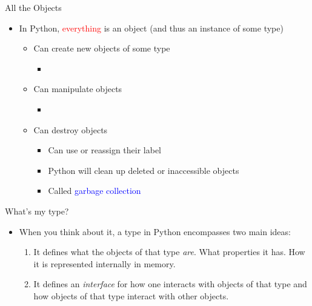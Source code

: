 \documentclass[pdf, aspectratio=169, 12pt]{beamer}
\begin{document}
\begin{frame}{All the Objects}
	\begin{itemize}
		\item In Python, \textcolor{Red}{everything} is an object (and thus an instance of some type)
			\begin{itemize}
				\item Can \alert{create} new objects of some type
					\begin{itemize}
						\item {}
					\end{itemize}
				\item Can \alert{manipulate} objects
					\begin{itemize}
						\item {}
					\end{itemize}
				\item Can \alert{destroy} objects
					\begin{itemize}
						\item Can use  or reassign their label
						\item Python will clean up deleted or inaccessible objects
						\item Called \textcolor{Blue}{garbage collection}
					\end{itemize}
			\end{itemize}
	\end{itemize}
\end{frame}

\begin{frame}{What's my type?}
	\begin{itemize}
		\item When you think about it, a \alert{type} in Python encompasses two main ideas:
			\begin{enumerate}[<+->]
				\item It defines what the objects of that type \emph{are}. What properties it has. How it is represented internally in memory.
				\item It defines an \emph{interface} for how one interacts with objects of that type and how objects of that type interact with other objects.
			\end{enumerate}
	\end{itemize}
\end{frame}
\end{document}
